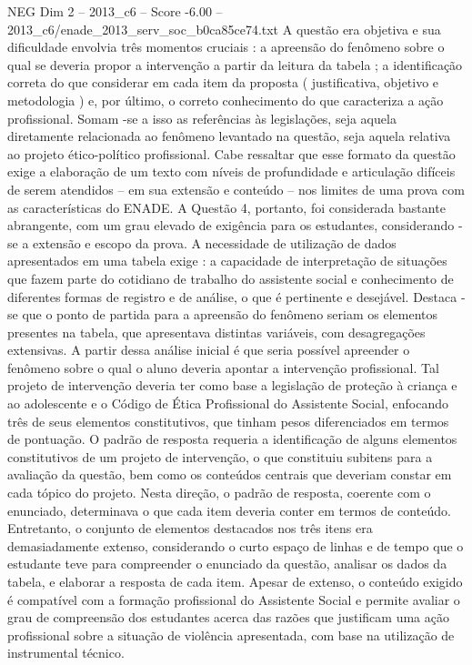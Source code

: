 \begin{textsample}{NEG Dim 2 – 2013\_c6 – Score -6.00 – 2013\_c6/enade\_2013\_serv\_soc\_b0ca85ce74.txt}
A questão era objetiva e sua dificuldade envolvia três momentos cruciais : a apreensão do fenômeno sobre o qual se deveria propor a intervenção a partir da leitura da tabela ; a identificação correta do que considerar em cada item da proposta ( justificativa, objetivo e metodologia ) e, por último, o correto conhecimento do que caracteriza a ação profissional.
Somam -se a isso as referências às legislações, seja aquela diretamente relacionada ao fenômeno levantado na questão, seja aquela relativa ao projeto ético-político profissional.
Cabe ressaltar que esse formato da questão exige a elaboração de um texto com níveis de profundidade e articulação difíceis de serem atendidos – em sua extensão e conteúdo – nos limites de uma prova com as características do ENADE.
A Questão 4, portanto, foi considerada bastante abrangente, com um grau elevado de exigência para os estudantes, considerando -se a extensão e escopo da prova.
A necessidade de utilização de dados apresentados em uma tabela exige : a capacidade de interpretação de situações que fazem parte do cotidiano de trabalho do assistente social e conhecimento de diferentes formas de registro e de análise, o que é pertinente e desejável.
Destaca -se que o ponto de partida para a apreensão do fenômeno seriam os elementos presentes na tabela, que apresentava distintas variáveis, com desagregações extensivas.
A partir dessa análise inicial é que seria possível apreender o fenômeno sobre o qual o aluno deveria apontar a intervenção profissional.
Tal projeto de intervenção deveria ter como base a legislação de proteção à criança e ao adolescente e o Código de Ética Profissional do Assistente Social, enfocando três de seus elementos constitutivos, que tinham pesos diferenciados em termos de pontuação.
O padrão de resposta requeria a identificação de alguns elementos constitutivos de um projeto de intervenção, o que constituiu subitens para a avaliação da questão, bem como os conteúdos centrais que deveriam constar em cada tópico do projeto.
Nesta direção, o padrão de resposta, coerente com o enunciado, determinava o que cada item deveria conter em termos de conteúdo.
Entretanto, o conjunto de elementos destacados nos três itens era demasiadamente extenso, considerando o curto espaço de linhas e de tempo que o estudante teve para compreender o enunciado da questão, analisar os dados da tabela, e elaborar a resposta de cada item.
Apesar de extenso, o conteúdo exigido é compatível com a formação profissional do Assistente Social e permite avaliar o grau de compreensão dos estudantes acerca das razões que justificam uma ação profissional sobre a situação de violência apresentada, com base na utilização de instrumental técnico.

\end{textsample}
